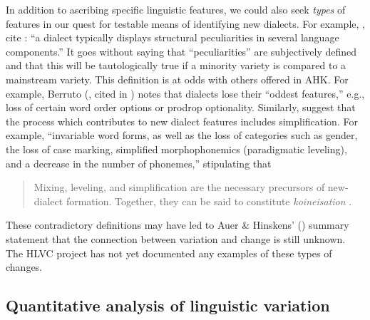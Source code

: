 \documentclass[output=paper]{LSP/langsci}
\begin{document}
In addition to ascribing specific linguistic features, we could also seek \textit{types} of features in our quest for testable means of identifying new dialects. For example, \citet[1]{auer_study_2004}, cite \citet[5]{chambers_dialectology_1998}: “a dialect typically displays structural peculiarities in several language components.” It goes without saying that “peculiarities” are subjectively defined and that this will be tautologically true if a minority variety is compared to a mainstream variety. This definition is at odds with others offered in AHK. For example, Berruto (\citeyear{berruto_fondamenti_1995}, cited in \citealt [11]{auer_study_2004}) notes that dialects lose their “oddest features,” e.g., loss of certain word order options or prodrop optionality. Similarly, \citet[198]{auer_birth_2004} suggest that the  process which contributes to new dialect features includes simplification. For example, “invariable word forms, as well as the loss of categories such as gender, the loss of case marking, simplified morphophonemics (paradigmatic leveling), and a decrease in the number of phonemes,” stipulating that

\begin{quote}
Mixing, leveling, and simplification are the necessary precursors of new-dialect formation. Together, they can be said to constitute \textit{koineisation }\citep[199]{auer_study_2004}.
\end{quote}

These contradictory definitions may have led to Auer \& Hinskens' (\citeyear[356]{auer_role_2005}) summary statement that the connection between variation and change is still unknown. The HLVC project has not yet documented any examples of these types of changes.

\subsection{Quantitative analysis of linguistic variation}
\end{document}
